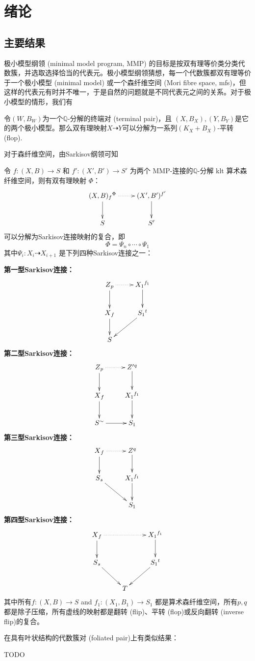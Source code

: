 \chapter{绪论}
\section{主要结果}

极小模型纲领 (minimal model program, MMP) 的目标是按双有理等价类分类代数簇，并选取选择恰当的代表元。极小模型纲领猜想，每一个代数簇都双有理等价于一个极小模型 (minimal model) 或一个森纤维空间 (Mori fibre space, mfs)，但这样的代表元有时并不唯一，于是自然的问题就是不同代表元之间的关系。对于极小模型的情形，我们有
\begin{theorem}[平转连接极小模型]
	令$(W,B_{W})$为一个$\mathbb{Q}$-分解的终端对 (terminal pair)，且 $(X,B_{X}), (Y,B_{Y})$是它的两个极小模型。那么双有理映射$X \dashrightarrow Y$可以分解为一系列$(K_{X}+B_{X})$-平转 (flop).
\end{theorem}

对于森纤维空间，由Sarkisov纲领可知
\begin{theorem}[主定理]\label{main}
	令 $ f:(X, B)\to S$ 和 $f':(X', B')\to S' $ 为两个 MMP-连接的$ \mathbb{Q} $-分解 klt 算术森纤维空间，则有双有理映射 $\Phi$：
	\[
		\xymatrix{
			(X,B){\ar[d]}_{f}{\ar@{.>}[r]}^\Phi & (X',B'){\ar[d]}^{f'}\\
			S & S'}
	\]
	可以分解为Sarkisov连接映射的复合，即
	\[
		\Phi=\Psi_{n}\circ \cdots \circ \Psi_{1}
	\]
	其中$\Psi_{i}:X_{i}\dashrightarrow X_{i+1} $ 是下列四种Sarkisov连接之一：

  \textbf{第一型Sarkisov连接：}
  \[\xymatrix{
			Z{\ar[d]}_{p}\ar@{.>}[r]&X_{1}{\ar[d]}^{f_1}\\
			X{\ar[d]}_{f}&S_1{\ar[dl]}^{t}\\
  S &}\]
  \textbf{第二型Sarkisov连接：}
  \[\xymatrix{
			Z{\ar[d]}_{p}\ar@{.>}[r]&Z'{\ar[d]}^{q}&\\
			X{\ar[d]}_{f}&X_1{\ar[d]}^{f_1}\\
  S{\ar[r]}^{\sim}&S_1}\]
  \textbf{第三型Sarkisov连接：}
\[ \xymatrix{
		X\ar@{.>}[r]{\ar[d]}_{f}& Z{\ar[d]}^q& \\
		S{\ar[rd]}_{s}         & X_{1}{\ar[d]}^{f_{1}}&\\
		&S_{1}
		} \]
  \textbf{第四型Sarkisov连接：}
\[ \xymatrix{
			X{\ar[d]}_{f}\ar@{.>}[rr]&&X_{1}{\ar[d]}^{f_1}\\
			S{\ar[dr]}_{s}&&S_{1}{\ar[dl]}^{t}\\
			&T &} \]
	其中所有$ f:(X, B)\to S $ and $ f_1:(X_1, B_1)\to S_1 $ 都是算术森纤维空间，所有$p,q$ 都是除子压缩，所有虚线的映射都是翻转 (flip)、平转 (flop)或反向翻转 (inverse flip)的复合。
\end{theorem}
在具有叶状结构的代数簇对 (foliated pair)上有类似结果：
\begin{theorem}[主定理2]
	TODO
\end{theorem}

